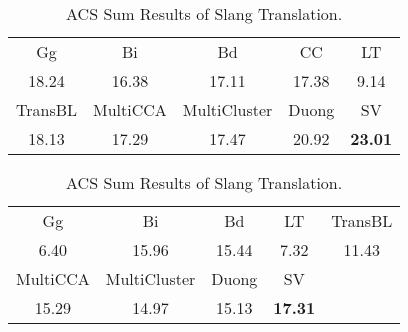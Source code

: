 \begin{table}[t] 
	\scriptsize
	\centering
	\begin{subtable}[h]{0.45\columnwidth}
		\centering
		\begin{tabular}{|ccccc|}
			\hline
			Gg&  Bi& Bd & CC & LT   \\ 
			18.24 &  16.38&  17.11 & 17.38 & 9.14 \\ \hline   
			TransBL& MultiCCA & MultiCluster & Duong   & SV \\ 
			18.13 &  17.29 & 17.47&  20.92& \textbf{23.01}\\ \hline  
		\end{tabular}
	\end{subtable}
	\hspace{10pt}
	\begin{subtable}[h]{0.45\columnwidth}
		\centering
		\begin{tabular}{|ccccc|}
			\hline
			Gg&  Bi& Bd &  LT   & TransBL\\ 
			6.40  &   15.96 &  15.44  & 7.32 & 11.43\\ \hline   
			MultiCCA & MultiCluster & Duong   & SV & \\ 
			15.29 & 14.97&  15.13& \textbf{17.31} & \\ \hline  
		\end{tabular}
	\end{subtable} 
	\caption{ACS Sum Results of Slang Translation. \vspace{-10pt}}
	\label{tab:bleis_acs}
\end{table}

